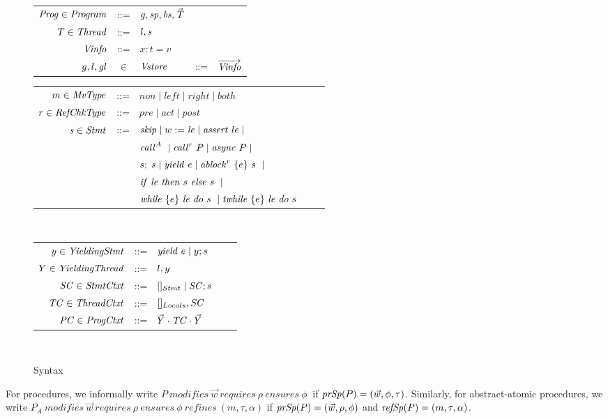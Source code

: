 \begin{figure}
\begin{tabular}{rclcl}
\end{tabular}
\begin{tabular}{rclcl}
$\Prog \in \Program$ & ::= & $\varsG, \specs, \bodies, \TS$ \\
$T \in \Thread$ & ::=  & $\varsL, \stmt$ \\
$\Vinfo$ & ::= & $x:t=v$ \\
$\varsG,\varsL,\vars$ & $\in$ & $\Vstore$ & ::= & $\Vinfos$ \\
\end{tabular}
\begin{tabular}{rclcl}
$m \in \moverType$ &::= &$\mathit{non} \mid \mathit{left} \mid \mathit{right} \mid \mathit{both}$ \\
$r \in \refType$ &::= &$\mathit{pre} \mid \mathit{act} \mid \mathit{post} $ \\
$\stmt \in \Stmt$ &::= & $\skipstmt \mid w := \locExpr \mid
\assert{le} \mid $ \\
                  & & $\call{A} \mid \call{r}{P} \mid \async{P} \mid $\\
                  & & $s;\;s \mid \yield{e} \mid \ablock{e}{s}{r} \mid$\\
                 & & $\ite{\locExpr}{s}{s} \mid$ \\
                  & & $\while{e}{\locExpr}{s} \mid \termwhile{e}{\locExpr}{s}$
                  \\ 
\end{tabular}\\
\begin{tabular}{rclcl}
$\YieldingStmt \in \mathit{YieldingStmt}$ &::= &$\yield{e} \mid \YieldingStmt;s$ \\
$\YieldingThread \in \mathit{YieldingThread}$ &::= &$\varsL, \YieldingStmt$ \\
$\StmtCtxt \in \mathit{StmtCtxt}$ &::= &$[]_{Stmt} \mid \StmtCtxt;s$ \\
$\ThreadCtxt \in \mathit{ThreadCtxt}$ &::= &$[]_{Locals}, \StmtCtxt$ \\
$\ProgCtxt \in \mathit{ProgCtxt}$ &::= &$\YieldingThreads \cdot \ThreadCtxt \cdot \YieldingThreads$ \\
\end{tabular}\\
\setlength{\tabcolsep}{6pt}
\caption{Syntax}
\label{fig:syntax}
\end{figure}

For procedures, we informally write $P\ \mathit{modifies}\
\vec{w}\ \mathit{requires}\ \rho\ \mathit{ensures}\ \phi\ $
if $\procSpecs(P) = (\vec{w}, \phi, \tau)$. Similarly, for
abstract-atomic procedures, we write $P_{A}\ \mathit{modifies}\
\vec{w}\ \mathit{requires}\ \rho\ \mathit{ensures}\ \phi\
\mathit{refines}\ (m, \tau, \alpha)$ if $\procSpecs(P) =
(\vec{w}, \rho, \phi)$ and $\procRefSpecs(P) = (m, \tau,
\alpha)$. 

